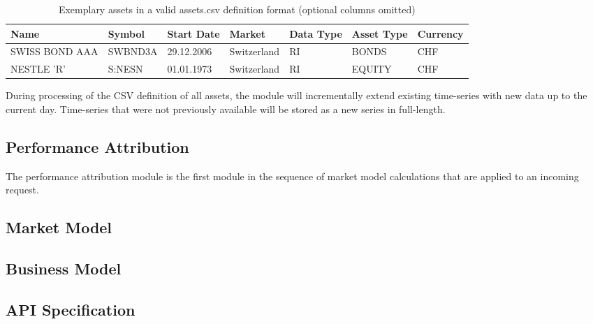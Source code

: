 \begin{table}[h!]
  \begin{tabular}{lllllll}
    \toprule
    Name & Symbol  & Start Date & Market      & Data Type & Asset Type & Currency \\
    \midrule
    SWISS BOND AAA & SWBND3A & 29.12.2006 & Switzerland & RI        & BONDS      & CHF      \\
    NESTLE 'R'     & S:NESN  & 01.01.1973 & Switzerland & RI        & EQUITY     & CHF      \\
    \bottomrule
  \end{tabular}
  \centering
  \caption{Exemplary assets in a valid assets.csv definition format (optional columns omitted)}
\end{table}

During processing of the CSV definition of all assets, the module will incrementally extend existing time-series with new data up to the current day. Time-series that were not previously available will be stored as a new series in full-length.


\subsection{Performance Attribution}
The performance attribution module is the first module in the sequence of market model calculations that are applied to an incoming request.


\subsection{Market Model}



\subsection{Business Model}



\subsection{API Specification}
